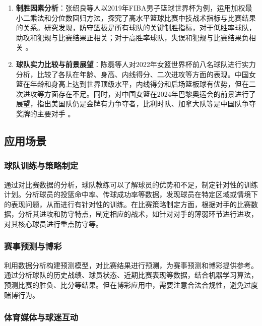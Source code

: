 \documentclass[UTF8]{ctexart}
\begin{document}
\begin{enumerate}
\def\labelenumi{\arabic{enumi}.}
\item
  \textbf{制胜因素分析}：张绍良等人以2019年FIBA男子篮球世界杯为例，运用加权最小二乘法和分位数回归方法，探究了高水平篮球比赛中技战术指标与比赛结果的关系。研究发现，防守篮板是所有球队的关键制胜指标，对于低胜率球队，助攻和犯规与比赛结果正相关；对于高胜率球队，失误和犯规与比赛结果负相关
  。
\item
  \textbf{球队实力比较与前景展望}：陈磊等人对2022年女篮世界杯前八名球队进行实力分析，比较了各队在年龄、身高、内线得分、二次进攻等方面的表现。中国女篮在年龄和身高上达到世界顶级水平，内线得分和后场篮板球有优势，但在二次进攻等方面存在不足。同时，对中国女篮在2024年巴黎奥运会的前景进行了展望，指出美国队仍是金牌有力争夺者，比利时队、加拿大队等是中国队争夺奖牌的主要对手
  。
\end{enumerate}

\subsection{应用场景}\label{ux4e09ux5e94ux7528ux573aux666f}

\subsubsection{球队训练与策略制定}\label{ux4e00uxff09ux7403ux961fux8badux7ec3ux4e0eux7b56ux7565ux5236ux5b9a}

通过对比赛数据的分析，球队教练可以了解球员的优势和不足，制定针对性的训练计划。分析球员的投篮命中率、传球成功率等数据，发现球员在特定区域或情境下的表现问题，从而进行有针对性的训练。在比赛策略制定方面，根据对手的比赛数据，分析其进攻和防守特点，制定相应的战术，如针对对手的薄弱环节进行进攻，对其核心球员进行重点防守等。

\subsubsection{赛事预测与博彩}\label{ux4e8cuxff09ux8d5bux4e8bux9884ux6d4bux4e0eux535aux5f69}

利用数据分析构建预测模型，对比赛结果进行预测，为赛事预测和博彩提供参考。通过分析球队的历史战绩、球员状态、近期比赛表现等数据，结合机器学习算法，预测比赛的胜负、比分等结果。但在博彩应用中，需要注意合法合规性，避免过度赌博行为。

\subsubsection{体育媒体与球迷互动}\label{ux4e09uxff09ux4f53ux80b2ux5a92ux4f53ux4e0eux7403ux8ff7ux4e92ux52a8}
\end{document}
